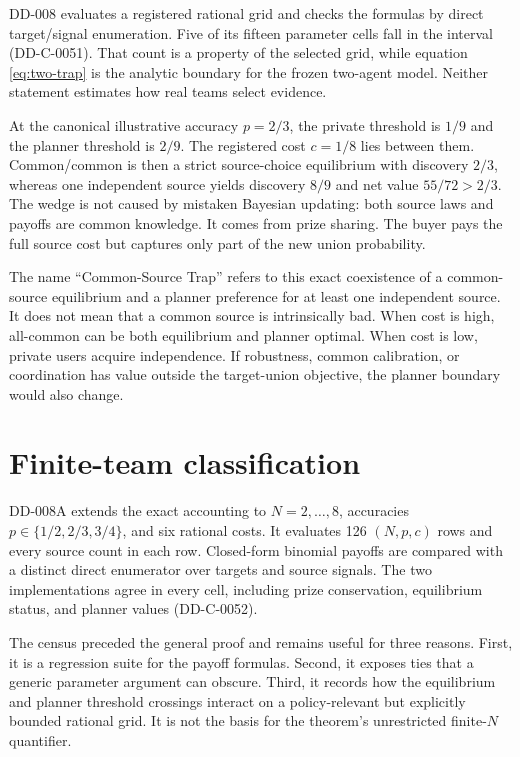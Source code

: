 \documentclass[11pt]{article}
\begin{document}
DD-008 evaluates a registered rational grid and checks the formulas by direct
target/signal enumeration. Five of its fifteen parameter cells fall in the
interval (DD-C-0051). That count is a property of the selected grid, while
equation \eqref{eq:two-trap} is the analytic boundary for the frozen two-agent
model. Neither statement estimates how real teams select evidence.

At the canonical illustrative accuracy $p=2/3$, the private threshold is $1/9$
and the planner threshold is $2/9$. The registered cost $c=1/8$ lies between
them. Common/common is then a strict source-choice equilibrium with discovery
$2/3$, whereas one independent source yields discovery $8/9$ and net value
$55/72>2/3$. The wedge is not caused by mistaken Bayesian updating: both source
laws and payoffs are common knowledge. It comes from prize sharing. The buyer
pays the full source cost but captures only part of the new union probability.

The name ``Common-Source Trap'' refers to this exact coexistence of a
common-source equilibrium and a planner preference for at least one independent
source. It does not mean that a common source is intrinsically bad. When cost is
high, all-common can be both equilibrium and planner optimal. When cost is low,
private users acquire independence. If robustness, common calibration, or
coordination has value outside the target-union objective, the planner boundary
would also change.

\section{Finite-team classification}

DD-008A extends the exact accounting to $N=2,\ldots,8$, accuracies
$p\in\{1/2,2/3,3/4\}$, and six rational costs. It evaluates 126
$(N,p,c)$ rows and every source count in each row. Closed-form binomial payoffs
are compared with a distinct direct enumerator over targets and source signals.
The two implementations agree in every cell, including prize conservation,
equilibrium status, and planner values (DD-C-0052).

The census preceded the general proof and remains useful for three reasons.
First, it is a regression suite for the payoff formulas. Second, it exposes ties
that a generic parameter argument can obscure. Third, it records how the
equilibrium and planner threshold crossings interact on a policy-relevant but
explicitly bounded rational grid. It is not the basis for the theorem's
unrestricted finite-$N$ quantifier.
\end{document}
